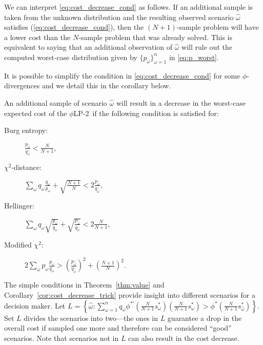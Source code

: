 \documentclass[opre,nonblindrev]{informs3} %
\newcommand{\plp}{$\phi$LP-2}
\begin{document}
We can interpret \eqref{eq:cost_decrease_cond} as follows. If an additional sample is taken from the unknown distribution and the resulting observed scenario $\hat{\omega}$ satisfies (\ref{eq:cost_decrease_cond}), then the $(N+1)$-sample problem will have a lower cost than the $N$-sample problem that was already solved.
This is equivalent to saying that an additional observation of $\hat{\omega}$ will rule out the computed worst-case distribution given by $\{p_\omega\}_{\omega=1}^{n}$ in \eqref{eq:p_worst}.

It is possible to simplify the condition in \eqref{eq:cost_decrease_cond} for some $\phi$-divergences and we detail this in the corollary below. 

\begin{corollary}
	\label{cor:cost_decrease_trick}
	An additional sample of scenario $\hat{\omega}$ will result in a decrease in the worst-case expected cost of the \plp\ if the following condition is satisfied for:\vspace*{-0.1in}
	\begin{multicols}{2}
		\begin{description}
			\item[Burg entropy:] $\frac{p_{\hat{\omega}}}{q_{\hat{\omega}}} < \frac{N}{N+1}$, %
			\item[$\chi^2$-distance:]  $\sum_\omega q_\omega \frac{q_\omega}{p_\omega} + \sqrt{\frac{N+1}{N}} < 2 \frac{p_{\hat{\omega}}}{q_{\hat{\omega}}}$,
			\item[Hellinger:] $\sum_\omega q_\omega \sqrt{\frac{p_\omega}{q_\omega}} + \sqrt{\frac{p_{\hat{\omega}}}{q_{\hat{\omega}}}} < 2 \frac{N}{N+1}$,
			\item[Modified $\chi^2$:] $2 \sum_\omega p_\omega \frac{p_\omega}{q_\omega} > \left(\frac{p_{\hat{\omega}}}{q_{\hat{\omega}}}\right)^2 + \left(\frac{N+1}{N}\right)^2$.
		\end{description}
	\end{multicols}
\end{corollary}

The simple conditions in Theorem~\ref{thm:value} and Corollary~\ref{cor:cost_decrease_trick} provide insight into different scenarios for a decision maker. 
Let $L = \left\{ \hat{\omega} : \sum_{\omega=1}^n q_\omega \phi^{*\prime}\left(\frac{N}{N+1}s^*_\omega\right) \left(\frac{N}{N+1}s^*_\omega\right) > \phi^*\left(\frac{N}{N+1}s^*_{\hat{\omega}}\right) \right\}$.
Set $L$ divides the scenarios into two---the ones in $L$ guarantee a drop in the overall cost if sampled one more and therefore can be considered ``good'' scenarios. 
Note that scenarios not in $L$ can also result in the cost decrease.
\end{document}
